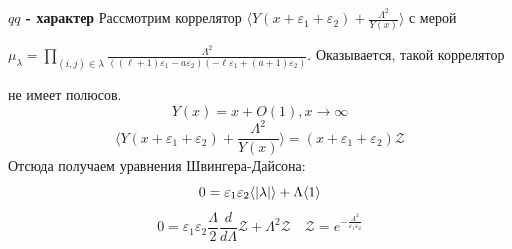 \documentclass[fullscreen=true, bookmarks=false]{beamer}
\begin{document}
\begin{frame}
{\bf $qq$ - характер}
Рассмотрим коррелятор
$
    \langle Y(x + \varepsilon_{1} + \varepsilon_{2}) + \frac{\Lambda^2}{Y(x)} \rangle
$    с мерой \newline

$    \mu_{\lambda} = \prod_{(i,j) \in \lambda} \frac{\Lambda^2}{((\ell + 1)\varepsilon_1 - a\varepsilon_2)(-\ell\varepsilon_1 + (a + 1)\varepsilon_2)}$.
Оказывается, такой коррелятор \newline

не имеет полюсов.
\begin{equation}
    Y(x) = x + O(1), x \rightarrow \infty
\end{equation}
\begin{equation}
\langle Y(x + \varepsilon_{1} + \varepsilon_{2}) + \frac{\Lambda^2}{Y(x)} \rangle = (x + \varepsilon_1 + \varepsilon_2)\mathcal{Z}
\end{equation}
Отсюда получаем уравнения Швингера-Дайсона:
\begin{equation}
    0 = \varepsilon_1 \varepsilon_2 \langle \abs{\lambda} \rangle + \Lambda \langle 1 \rangle
\end{equation} 
\begin{equation}
    0=\varepsilon_1 \varepsilon_2\frac{\Lambda }{2}\frac{d}{d\Lambda}\mathcal{Z}+\Lambda^2\mathcal{Z} \quad \mathcal{Z}=e^{-\frac{\Lambda^2}{\varepsilon_1 \varepsilon_2}}
\end{equation}
\end{frame}
\end{document}
